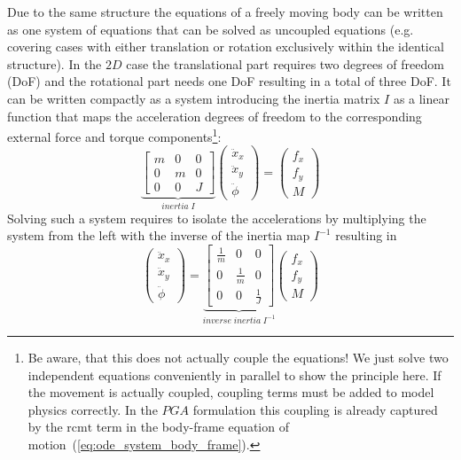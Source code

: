 Due to the same structure the equations of a freely moving body can be written as one
system of equations that can be solved as uncoupled equations (e.g. covering cases with
either translation or rotation exclusively within the identical structure). In the $2D$
case the translational part requires two degrees of freedom (DoF) and the rotational part
needs one DoF resulting in a total of three DoF. It can be written compactly as a system
introducing the inertia matrix $I$ as a linear function that maps the acceleration degrees
of freedom to the corresponding external force and torque components\footnote{Be aware,
that this does not actually couple the equations! We just solve two independent equations
conveniently in parallel to show the principle here. If the movement is actually coupled,
coupling terms must be added to model physics correctly. In the $PGA$ formulation this
coupling is already captured by the $\mathrm{rcmt}$ term in the body-frame equation of
motion~(\ref{eq:ode_system_body_frame}).}:
\begin{equation}
    \underbrace{
    \begin{bmatrix}
        m & 0 & 0 \\
        0 & m & 0 \\
        0 & 0 & J
    \end{bmatrix}
    }_{inertia \; I}
    \begin{pmatrix}
        \ddot{x}_x \\
        \ddot{x}_y \\
        \ddot{\phi} 
    \end{pmatrix}
    =
    \begin{pmatrix}
        {f}_x \\
        {f}_y \\
        {M} 
    \end{pmatrix} 
\end{equation}
Solving such a system requires to isolate the accelerations by multiplying the system from
the left with the inverse of the inertia map $I^{-1}$ resulting in
\begin{equation}
    \begin{pmatrix}
        \ddot{x}_x \\
        \ddot{x}_y \\
        \ddot{\phi} 
    \end{pmatrix}
    =
    \underbrace{
    \begin{bmatrix}
        \frac{1}{m} & 0           & 0 \\
        0           & \frac{1}{m} & 0 \\
        0           & 0           & \frac{1}{J}
    \end{bmatrix}
    }_{inverse \; inertia \; I^{-1}}
    \begin{pmatrix}
        {f}_x \\
        {f}_y \\
        {M} 
    \end{pmatrix} 
    \label{eq:classical_sys_Newton_Euler_2nd_order}
\end{equation}

